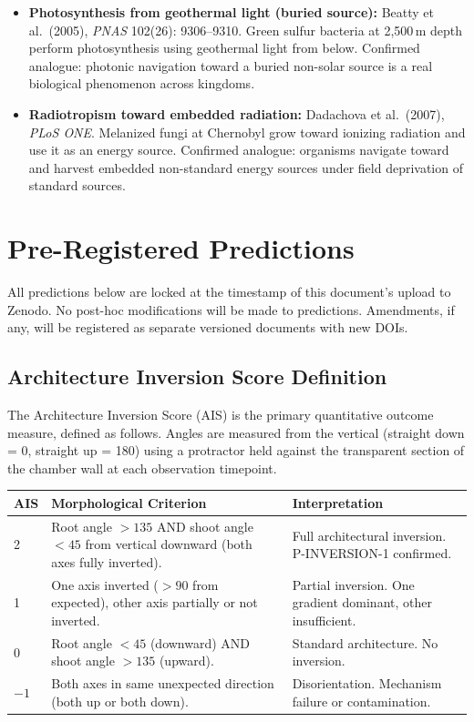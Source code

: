 \documentclass[10pt, a4paper]{article}
\begin{document}
\begin{itemize}[itemsep=0.2em]
  \item \textbf{Photosynthesis from geothermal light
    (buried source):}
    Beatty et al.\ (2005), \textit{PNAS} 102(26):
    9306--9310.
    Green sulfur bacteria at 2,500\,m depth perform
    photosynthesis using geothermal light from below.
    Confirmed analogue: photonic navigation toward
    a buried non-solar source is a real biological
    phenomenon across kingdoms.

  \item \textbf{Radiotropism toward embedded radiation:}
    Dadachova et al.\ (2007), \textit{PLoS ONE}.
    Melanized fungi at Chernobyl grow toward ionizing
    radiation and use it as an energy source.
    Confirmed analogue: organisms navigate toward and
    harvest embedded non-standard energy sources
    under field deprivation of standard sources.
\end{itemize}

\vspace{0.5em}

\section{Pre-Registered Predictions}

All predictions below are locked at the timestamp
of this document's upload to Zenodo.
No post-hoc modifications will be made to predictions.
Amendments, if any, will be registered as separate
versioned documents with new DOIs.

\subsection{Architecture Inversion Score Definition}

The Architecture Inversion Score (AIS) is the primary
quantitative outcome measure, defined as follows.
Angles are measured from the vertical
(straight down = 0\textdegree, straight up = 180\textdegree)
using a protractor held against the transparent section
of the chamber wall at each observation timepoint.

\medskip
\begin{tabular}{p{1.2cm}p{4.8cm}p{5.5cm}}
\toprule
\textbf{AIS} & \textbf{Morphological Criterion} &
\textbf{Interpretation} \\
\midrule
2 &
Root angle $>135$\textdegree{} AND shoot angle
$<45$\textdegree{} from vertical downward
(both axes fully inverted). &
Full architectural inversion.
P-INVERSION-1 confirmed. \\[0.4em]
1 &
One axis inverted ($>90$\textdegree{} from expected),
other axis partially or not inverted. &
Partial inversion.
One gradient dominant, other insufficient. \\[0.4em]
0 &
Root angle $<45$\textdegree{} (downward) AND
shoot angle $>135$\textdegree{} (upward). &
Standard architecture.
No inversion. \\[0.4em]
$-1$ &
Both axes in same unexpected direction
(both up or both down). &
Disorientation.
Mechanism failure or contamination. \\
\bottomrule
\end{tabular}
\end{document}
